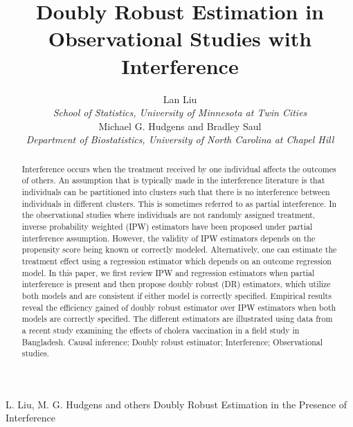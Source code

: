 \documentclass[oupdraft]{bio}
\begin{document}
\title{Doubly Robust Estimation in Observational Studies with Interference}

\author{
Lan Liu\\[4pt]
\textit{School of Statistics, University of Minnesota at Twin Cities}\\
Michael G. Hudgens and Bradley Saul\\
\textit{Department of Biostatistics, University of North Carolina at Chapel Hill}}
\markboth%
{L. Liu, M. G. Hudgens and others}
{Doubly Robust Estimation in the Presence of Interference}

\maketitle


\begin{abstract}
{Interference occurs when the treatment received by one individual affects the outcomes of others. An assumption that is typically made in the interference literature is that individuals can be partitioned into
clusters such that there is no interference between individuals in different clusters. This is sometimes referred to as partial interference. In the observational studies where individuals are not randomly assigned treatment, inverse probability weighted (IPW) estimators have been proposed under partial interference assumption. However, the validity of IPW estimators depends on the propensity score being known or correctly modeled. Alternatively, one can estimate the treatment effect using a  regression estimator which depends on an outcome regression model. In this paper, we first review IPW and regression estimators when partial interference is present and then propose
doubly robust (DR) estimators, which utilize both models and are consistent if either model is correctly specified. Empirical results reveal the efficiency gained of doubly robust estimator over IPW estimators when both models are correctly specified. The different estimators are illustrated using data from a recent study examining the effects of cholera vaccination in a field study in Bangladesh.}
{Causal inference; Doubly robust estimator; Interference; Observational studies.}
\end{abstract}
\end{document}
